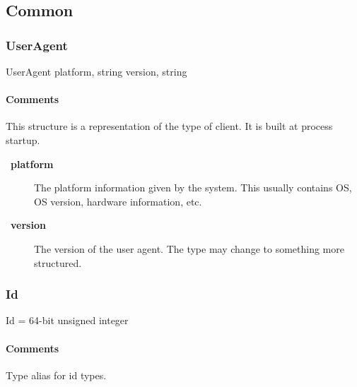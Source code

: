 \documentclass[a4paper,10pt]{article}
\let\Item\item
\newcommand\SpecialItem{\renewcommand\item[1][]{\Item[\textbullet~\bfseries##1]}
}
\begin{document}
\subsection{Common}
\label{sec:structure:common}

\subsubsection{UserAgent}

\begin{verbbox}
UserAgent
{
  platform, string
  version, string
}
\end{verbbox}
\begin{center}
\theverbbox
\end{center}

\begin{inparaitem}[ ]
 \item \infrastructure
\end{inparaitem}

\paragraph*{Comments}
This structure is a representation of the type of client. It is built at process startup.

\SpecialItem
\begin{description}
 \item[platform] The platform information given by the system. This usually contains OS, OS version, hardware information, etc.
 \item[version] The version of the user agent. The type may change to something more structured.
\end{description}

\subsubsection{Id}

\begin{verbbox}
Id = 64-bit unsigned integer
\end{verbbox}
\begin{center}
\theverbbox
\end{center}

\begin{inparaitem}[ ]
 \item \infrastructure
\end{inparaitem}

\paragraph*{Comments}
Type alias for id types.
\end{document}
